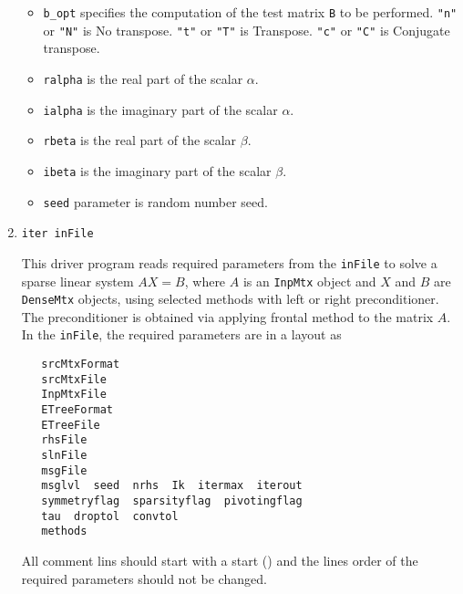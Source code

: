 \begin{enumerate}
\begin{itemize}
\item
{\tt b\_opt} specifies the computation of the test matrix {\tt B} 
to be performed.
{\tt "n"} or {\tt "N"} is No transpose.
{\tt "t"} or {\tt "T"} is Transpose. 
{\tt "c"} or {\tt "C"} is Conjugate transpose.
\item
{\tt ralpha} is the real part of the scalar $\alpha$.
\item
{\tt ialpha} is the imaginary part of the scalar $\alpha$.
\item
{\tt rbeta} is the real part of the scalar $\beta$.
\item
{\tt ibeta} is the imaginary part of the scalar $\beta$.
\item
{\tt seed} parameter is random number seed.
\end{itemize}

\item
\begin{verbatim}
iter inFile
\end{verbatim}
This driver program reads required parameters from the {\tt inFile}
to solve a sparse linear system $AX=B$, where $A$ is an {\tt InpMtx} object
and $X$ and $B$ are {\tt DenseMtx} objects, using selected methods with 
left or right preconditioner. The preconditioner is obtained via applying 
frontal method to the  matrix $A$.
In the {\tt inFile},
the required parameters are in a layout as
\begin{verbatim}
   srcMtxFormat
   srcMtxFile
   InpMtxFile
   ETreeFormat
   ETreeFile
   rhsFile
   slnFile
   msgFile 
   msglvl  seed  nrhs  Ik  itermax  iterout
   symmetryflag  sparsityflag  pivotingflag
   tau  droptol  convtol
   methods
\end{verbatim}
All comment lins should start with a start ({\tt *}) and the lines 
order of the required parameters should not be changed.
\par
\begin{itemize}


\end{itemize}
\end{enumerate}
